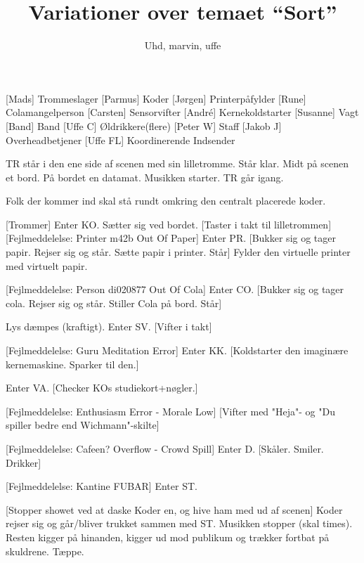 \documentclass[a4paper]{article}
\title{Variationer over temaet ``Sort''}
\author{Uhd, marvin, uffe}
\begin{document}
\maketitle
\begin{roles}
[Mads] Trommeslager
[Parmus] Koder
[Jørgen] Printerpåfylder
[Rune] Colamangelperson
[Carsten] Sensorvifter
[Andr\'e] Kernekoldstarter 
[Susanne] Vagt
[Band] Band
[Uffe C] Øldrikkere(flere)
[Peter W] Staff
[Jakob J] Overheadbetjener
[Uffe FL] Koordinerende Indsender
\end{roles}

\begin{props}
\end{props}

\begin{sketch}
\scene TR står i den ene side af scenen med sin lilletromme. Står
klar. Midt på scenen et bord. På bordet en datamat. Musikken starter. TR går igang.

\scene Folk der kommer ind skal stå rundt omkring den centralt
placerede koder.

[Trommer]
\scene Enter KO. Sætter sig ved bordet.
[Taster i takt til lilletrommen]
[Fejlmeddelelse: Printer m42b Out Of Paper]
\scene Enter PR. 
[Bukker sig og tager papir. Rejser sig og står. Sætte papir i
printer. Står] 
\scene Fylder den virtuelle printer med virtuelt papir.

[Fejlmeddelelse: Person di020877 Out Of Cola]
\scene Enter CO. 
[Bukker sig og tager cola. Rejser sig og står. Stiller Cola
på bord. Står] 

\scene Lys dæmpes (kraftigt). Enter SV.
[Vifter i takt] 

[Fejlmeddelelse: Guru Meditation Error]
\scene Enter KK. 
[Koldstarter den imaginære kernemaskine. Sparker til den.] 

\scene Enter VA. 
[Checker KOs studiekort+nøgler.] 

[Fejlmeddelelse: Enthusiasm Error - Morale Low]
[Vifter med "Heja"- og "Du spiller bedre end Wichmann"-skilte] 

[Fejlmeddelelse: Cafeen? Overflow - Crowd Spill]
\scene Enter D. 
[Skåler. Smiler. Drikker] 

[Fejlmeddelelse: Kantine FUBAR] \scene Enter ST.

[Stopper showet ved at daske Koder en, og hive ham med ud af
scenen] \scene Koder rejser sig og går/bliver trukket sammen med ST.
Musikken stopper (skal times). Resten kigger på hinanden, kigger ud
mod publikum og trækker fortbat på skuldrene.  Tæppe.
\end{sketch}
\end{document}
